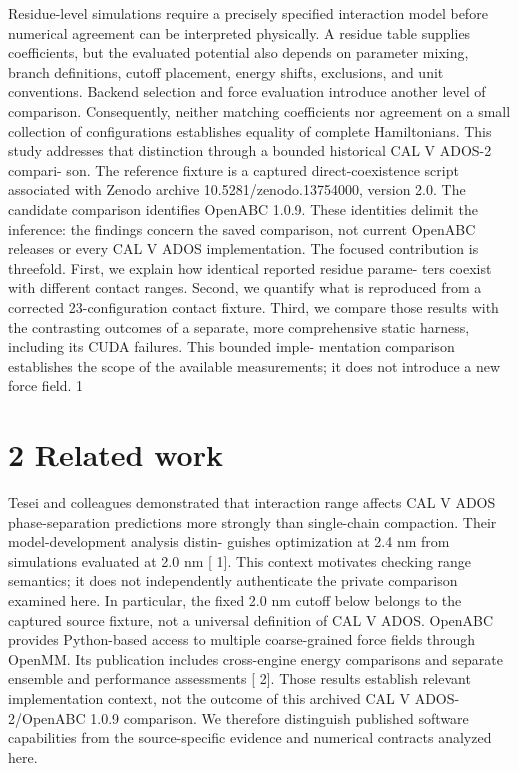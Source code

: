 \documentclass[11pt]{article}
\begin{document}
Residue-level simulations require a precisely specified interaction model before numerical agreement
can be interpreted physically. A residue table supplies coefficients, but the evaluated potential also
depends on parameter mixing, branch definitions, cutoff placement, energy shifts, exclusions, and
unit conventions. Backend selection and force evaluation introduce another level of comparison.
Consequently, neither matching coefficients nor agreement on a small collection of configurations
establishes equality of complete Hamiltonians.
This study addresses that distinction through a bounded historical CAL V ADOS-2 compari-
son. The reference fixture is a captured direct-coexistence script associated with Zenodo archive
10.5281/zenodo.13754000, version 2.0. The candidate comparison identifies OpenABC 1.0.9. These
identities delimit the inference: the findings concern the saved comparison, not current OpenABC
releases or every CAL V ADOS implementation.
The focused contribution is threefold. First, we explain how identical reported residue parame-
ters coexist with different contact ranges. Second, we quantify what is reproduced from a corrected
23-configuration contact fixture. Third, we compare those results with the contrasting outcomes of
a separate, more comprehensive static harness, including its CUDA failures. This bounded imple-
mentation comparison establishes the scope of the available measurements; it does not introduce a
new force field.
1


\section*{2 Related work}

Tesei and colleagues demonstrated that interaction range affects CAL V ADOS phase-separation
predictions more strongly than single-chain compaction. Their model-development analysis distin-
guishes optimization at 2.4 nm from simulations evaluated at 2.0 nm [ 1]. This context motivates
checking range semantics; it does not independently authenticate the private comparison examined
here. In particular, the fixed 2.0 nm cutoff below belongs to the captured source fixture, not a
universal definition of CAL V ADOS.
OpenABC provides Python-based access to multiple coarse-grained force fields through OpenMM.
Its publication includes cross-engine energy comparisons and separate ensemble and performance
assessments [ 2]. Those results establish relevant implementation context, not the outcome of this
archived CAL V ADOS-2/OpenABC 1.0.9 comparison. We therefore distinguish published software
capabilities from the source-specific evidence and numerical contracts analyzed here.
\end{document}
